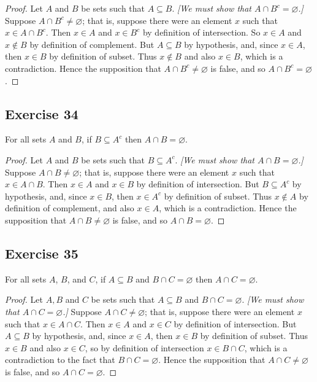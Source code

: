 \documentclass[14pt]{extarticle}
\newcommand{\es}{\varnothing}
\begin{document}
\begin{proof}
Let $A$ and $B$ be sets such that \(A \subseteq B\). {\it [We must show that \(A \cap B^c = \es\).]} Suppose \(A \cap 
B^c \neq \es\); that is, suppose there were an element $x$ such that \(x \in A \cap B^c\). Then \(x \in A\) and 
\(x \in B^c\) by definition of intersection. So \(x \in A\) and \(x \notin B\) by definition of complement. But 
\(A \subseteq B\) by hypothesis, and, since \(x \in A\), then \(x \in B\) by definition of subset. Thus 
\(x \notin B\) and also \(x \in B\), which is a contradiction. Hence the supposition that \(A \cap B^c \neq 
\es\) is false, and so \(A \cap B^c = \es\).
\end{proof}

\subsection{Exercise 34}
For all sets $A$ and $B$, if \(B \subseteq A^c\) then \(A \cap B = \es\).

\begin{proof}
Let $A$ and $B$ be sets such that \(B \subseteq A^c\). {\it [We must show that \(A \cap B = \es\).]} Suppose \(A \cap B 
\neq \es\); that is, suppose there were an element $x$ such that \(x \in A \cap B\). Then \(x \in A\) and \(x \in B\) 
by definition of intersection. But \(B \subseteq A^c\) by hypothesis, and, since \(x \in B\), then \(x \in A^c\) by 
definition of subset. Thus \(x \notin A\) by definition of complement, and also \(x \in A\), which is a contradiction. 
Hence the supposition that \(A \cap B \neq \es\) is false, and so \(A \cap B = \es\).
\end{proof}

\subsection{Exercise 35}
For all sets $A$, $B$, and $C$, if \(A \subseteq B\) and \(B \cap C = \es\) then \(A \cap C = \es\).

\begin{proof}
Let $A,B$ and $C$ be sets such that \(A \subseteq B\) and \(B \cap C = \es\). {\it [We must show that \(A \cap C = 
\es\).]} Suppose \(A \cap C \neq \es\); that is, suppose there were an element $x$ such that \(x \in A \cap C\). 
Then \(x \in A\) and \(x \in C\) by definition of intersection. But \(A \subseteq B\) by hypothesis, and, 
since \(x \in A\), then \(x \in B\) by definition of subset. Thus \(x \in B\) and also \(x \in C\), so by 
definition of intersection \(x \in B \cap C\), which is a contradiction to the fact that \(B \cap C = \es\). Hence 
the supposition that \(A \cap C \neq \es\) is false, and so \(A \cap C = \es\).
\end{proof}
\end{document}
